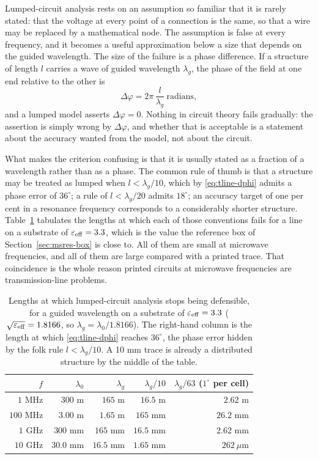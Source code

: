 Lumped-circuit analysis rests on an assumption so familiar that it is rarely stated: that the voltage at every
point of a connection is the same, so that a wire may be replaced by a mathematical node. The assumption is
false at every frequency, and it becomes a useful approximation below a size that depends on the guided
wavelength. The size of the failure is a phase difference. If a structure of length $l$ carries a wave of
guided wavelength $\lambda_g$, the phase of the field at one end relative to the other is
\begin{equation}
  \Delta\varphi = 2\pi\,\frac{l}{\lambda_g}\ \text{radians},
  \label{eq:tline-dphi}
\end{equation}
and a lumped model asserts $\Delta\varphi = 0$. Nothing in circuit theory fails gradually: the assertion is
simply wrong by $\Delta\varphi$, and whether that is acceptable is a statement about the accuracy wanted from
the model, not about the circuit.

What makes the criterion confusing is that it is usually stated as a fraction of a wavelength rather than as a
phase. The common rule of thumb is that a structure may be treated as lumped when $l < \lambda_g/10$, which by
\eqref{eq:tline-dphi} admits a phase error of $36^\circ$; a rule of $l < \lambda_g/20$ admits $18^\circ$; an
accuracy target of one per cent in a resonance frequency corresponds to a considerably shorter structure.
Table~\ref{tab:tline-lumped} tabulates the lengths at which each of those conventions fails for a line on a
substrate of $\varepsilon_{\mathrm{eff}} = 3.3$, which is the value the reference box of
Section~\ref{sec:msres-box} is close to. All of them are small at microwave frequencies, and all of them are
large compared with a printed trace. That coincidence is the whole reason printed circuits at microwave
frequencies are transmission-line problems.

\begin{table}[H]
  \centering
  \caption{Lengths at which lumped-circuit analysis stops being defensible, for a guided wavelength on a
  substrate of $\varepsilon_{\mathrm{eff}} = 3.3$ ($\sqrt{\varepsilon_{\mathrm{eff}}} = 1.8166$, so
  $\lambda_g = \lambda_0/1.8166$). The right-hand column is the length at which \eqref{eq:tline-dphi} reaches
  $36^\circ$, the phase error hidden by the folk rule $l<\lambda_g/10$. A 10 mm trace is already a distributed
  structure by the middle of the table.}
  \label{tab:tline-lumped}
  \small
  \begin{tabular}{@{}rrrrr@{}}
    \toprule
    $f$ & $\lambda_0$ & $\lambda_g$ & $\lambda_g/10$ & $\lambda_g/63$ ($1^\circ$ per cell) \\
    \midrule
    $1$ MHz     & $300$ m      & $165$ m      & $16.5$ m     & $2.62$ m \\
    $100$ MHz   & $3.00$ m     & $1.65$ m     & $165$ mm     & $26.2$ mm \\
    $1$ GHz     & $300$ mm     & $165$ mm     & $16.5$ mm    & $2.62$ mm \\
    $10$ GHz    & $30.0$ mm    & $16.5$ mm    & $1.65$ mm    & $262\ \mu$m \\
    \bottomrule
  \end{tabular}
\end{table}

